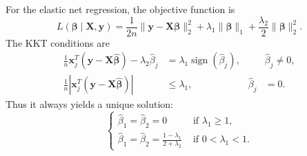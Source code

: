 \documentclass[a4 paper]{article}
\numberwithin{equation}{section}
\newcommand{\0}{\mathbf{0}}
\begin{document}
	
		\bigskip
For the elastic net regression, the objective function is
$$
	L(\boldsymbol{\beta} \mid \mathbf{X}, \mathbf{y})= \frac{1}{2 n}\|\mathbf{y}-\mathbf{X} \boldsymbol{\beta}\|_2^2 +\lambda_1\|\boldsymbol{\beta}\|_1+\frac{\lambda_2}{2}\|\boldsymbol{\beta}\|_2^2.
$$
 The KKT conditions are  
 $$
 \begin{aligned}
 	\frac{1}{n} \mathbf{x}_j^T(\mathbf{y}-\mathbf{X} \widehat{\boldsymbol{\beta}})-\lambda_2 \widehat{\beta}_j & =\lambda_1 \operatorname{sign}\left(\widehat{\beta}_j\right), & & \widehat{\beta}_j \neq 0, \\
 	\frac{1}{n}\left|\mathbf{x}_j^T(\mathbf{y}-\mathbf{X} \widehat{\boldsymbol{\beta}})\right| & \leq \lambda_1, & \widehat{\beta}_j & =0.
 \end{aligned}
 $$
Thus it always yields a unique solution:
	$$
	\begin{cases}\widehat{\beta}_1=\widehat{\beta}_2=0 & \text { if } \lambda_1 \geq 1, \\ \widehat{\beta}_1=\widehat{\beta}_2=\frac{1-\lambda_1}{2+\lambda_2} & \text { if } 0<\lambda_1<1 .\end{cases}
	$$
	
	
	
\end{document}
